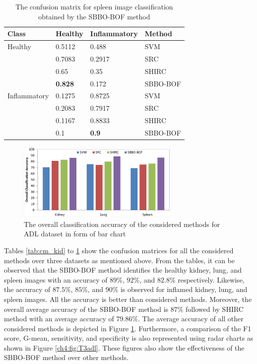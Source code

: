  \begin{table}
\scriptsize
\centering
 \caption[The confusion matrix for spleen image classification obtained by the SBBO-BOF method]{\fontsize{10pt}{12pt}\selectfont The confusion matrix for spleen image classification obtained by the SBBO-BOF method}
    \label{tab:cm_spl}
{\renewcommand{\arraystretch}{1.2}    
\begin{tabular}{|p{0.7in}|p{0.45in}|p{0.6in}|p{0.7in}|}
    \hline
Class    &    Healthy    &    Inflammatory    &    Method    \\
\hline
Healthy    &    0.5112    &    0.488    &    SVM    \\
    &    0.7083    &    0.2917    &    SRC    \\
    &    0.65    &    0.35    &    SHIRC    \\
    &\textbf{    0.828    }&    0.172    &    SBBO-BOF    \\
\hline
Inflammatory    &    0.1275    &    0.8725    &    SVM    \\
    &    0.2083    &    0.7917    &    SRC    \\
    &    0.1167    &    0.8833    &    SHIRC    \\
    &    0.1    &\textbf{    0.9    }&    SBBO-BOF    \\
\hline
 \end{tabular}}
\end{table}
\begin{figure}
\centering
\includegraphics[width=0.7\textwidth]{adlbar}
\caption[The overall classification accuracy of the considered methods for ADL dataset in form of bar chart]{\fontsize{10pt}{12pt}\selectfont The overall classification accuracy of the considered methods for ADL dataset in form of bar chart}
\label{fig:adlbar}
\end{figure}

Tables \ref{tab:cm_kid} to \ref{tab:cm_spl} show the confusion matrices for all the considered methods over three datasets as mentioned above. From the tables, it can be observed that the SBBO-BOF method identifies the healthy kidney, lung, and spleen images with an accuracy of $89\%$, $92\%$, and $82.8\%$ respectively. Likewise, the accuracy of $87.5\%$, $85\%$, and $90\%$ is observed for inflamed kidney, lung, and spleen images. All the accuracy is better than considered methods. Moreover, the overall average accuracy of the SBBO-BOF method is $87\%$ followed by SHIRC method with an average accuracy of $79.86\%$. The average accuracy of all other considered methods is depicted in Figure \ref{fig:adlbar}. Furthermore, a comparison of the F1 score, G-mean, sensitivity, and specificity is also represented using radar charts as shown in Figure \ref{ch4:fig:T3adl}. These figures also show the effectiveness of the SBBO-BOF method over other methods. 


